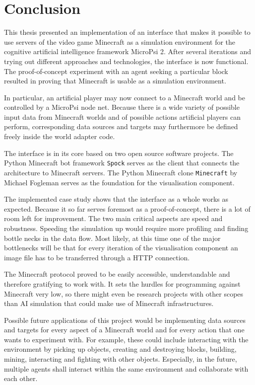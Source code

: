 \chapter{Conclusion}
\label{chap:5}
This thesis presented an implementation of an interface that makes it possible to use servers of the video game Minecraft as a simulation environment for the cognitive artificial intelligence framework MicroPsi 2. After several iterations and trying out different approaches and technologies, the interface is now functional. The proof-of-concept experiment with an agent seeking a particular block resulted in proving that Minecraft is usable as a simulation environment.

In particular, an artificial player may now connect to a Minecraft world and be controlled by a MicroPsi node net. Because there is a wide variety of possible input data from Minecraft worlds and of possible actions artificial players can perform, corresponding data sources and targets may furthermore be defined freely inside the world adapter code.

The interface is in its core based on two open source software projects. The Python Minecraft bot framework \texttt{Spock} serves as the client that connects the architecture to Minecraft servers. The Python Minecraft clone \texttt{Minecraft} by Michael Fogleman serves as the foundation for the visualisation component.

The implemented case study shows that the interface as a whole works as expected. Because it so far serves foremost as a proof-of-concept, there is a lot of room left for improvement. The two main critical aspects are speed and robustness. Speeding the simulation up would require more profiling and finding bottle necks in the data flow. Most likely, at this time one of the major bottlenecks will be that for every iteration of the visualisation component an image file has to be transferred through a HTTP connection.

The Minecraft protocol proved to be easily accessible, understandable and therefore gratifying to work with. It sets the hurdles for programming against Minecraft very low, so there might even be research projects with other scopes than AI simulation that could make use of Minecraft infrastructures.

Possible future applications of this project would be implementing data sources and targets for every aspect of a Minecraft world and for every action that one wants to experiment with. For example, these could include interacting with the environment by picking up objects, creating and destroying blocks, building, mining, interacting and fighting with other objects. Especially, in the future, multiple agents shall interact within the same environment and collaborate with each other.

